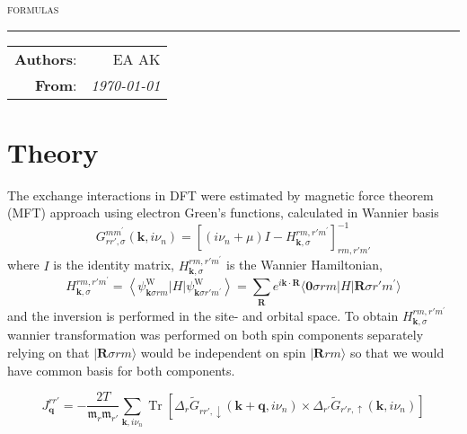 \documentclass[12pt,a4paper]{article}
\begin{document}
\begin{center}
    \LARGE \textsc{formulas}
\end{center}

\hrule

\phantom{42}

\begin{flushright}
    \begin{tabular}{rr}
        \textbf{Authors}: 
        & EA AK\\
        \textbf{From}: &
        \textit{\today}\\
    \end{tabular}
\end{flushright}

\thispagestyle{empty}


\section{Theory}
The exchange interactions in DFT were estimated by magnetic force theorem (MFT)  approach \cite{korotin_calculation_2015,liechtenstein_local_1987} using electron Green's functions, 
calculated in Wannier basis 
\begin{equation}
    G_{rr', \sigma}^{m m^{\prime}}(\mathbf{k},i \nu_n)=\left[(i \nu_n + \mu)I-H^{rm, r'm^{\prime}}_{\mathbf{k},\sigma}\right]_{rm,r'm'}^{-1}
\end{equation} 
where $I$ is the identity matrix,
 $H^{rm, r'm^{\prime}}_{\mathbf{k},\sigma}$ is the Wannier Hamiltonian, 
\[
    H^{rm, r'm^{\prime}}_{\mathbf{k},\sigma} =\left\langle\psi_{\mathbf{k} \sigma rm}^{\mathrm{W}}|H| \psi_{\mathbf{k} \sigma r'm^{\prime}}^{\mathrm{W}}\right\rangle=
    \sum_{\mathbf{R}} e^{i \mathbf{k} \cdot \mathbf{R}}\langle\mathbf{0} \sigma rm |H| \mathbf{R} \sigma r'm^{\prime}\rangle
\]
and the inversion is performed in the site- and orbital space. 
To obtain $H^{rm, r'm^{\prime}}_{\mathbf{k},\sigma}$ wannier transformation was performed on both spin components separately 
relying on that $| \mathbf{R} \sigma rm\rangle $ would be independent on spin $| \mathbf{R} rm\rangle$ so that we would have common basis for both components. 

\begin{equation}
    \label{JqDFT}
    J^{rr'}_{\mathbf{q}}=  -\frac{2T}{{\mathfrak m}_r{\mathfrak m}_{r'}}  \sum_{{\mathbf k},i \nu_n}\operatorname{Tr}
    \left[\Delta_{ r} \tilde{G}_{ rr',\downarrow}({\mathbf k}+ {\mathbf q},i \nu_n)\right. \times \left.\Delta_{r'} \tilde{G}_{r'r,\uparrow}({\mathbf k},i \nu_n) \right]
\end{equation}
\end{document}
